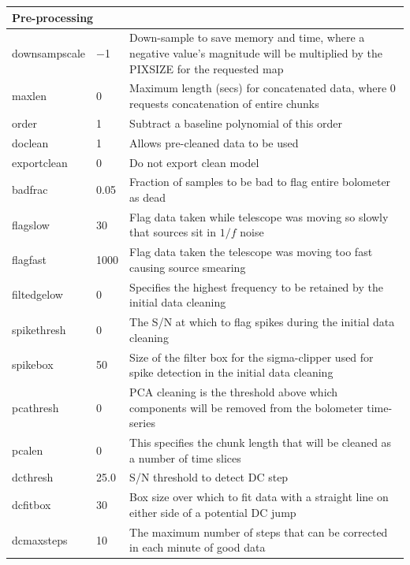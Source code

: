 \documentclass[twoside,11pt]{article}
\newenvironment{latexonly}{}{}
\renewcommand{\_}{\texttt{\symbol{95}}}
\begin{document}
\begin{latexonly}
\begin{table}[h]
\begin{center}
\begin{small}
\begin{tabular}{|p{2.5cm}|p{1.0cm}|p{11.2cm}|}
\hline
\multicolumn{3}{|l|}{\textbf{Pre-processing}}\\
\hline
downsampscale & $-$1 & Down-sample to save memory and time, where a negative
                       value's magnitude will be multiplied by the PIXSIZE
                       for the requested map \\
maxlen        &    0 & Maximum length (secs) for concatenated data, where
                       0 requests concatenation of entire chunks \\
order         &    1 & Subtract a baseline polynomial of this order \\
doclean       &    1 & Allows pre-cleaned data to be used \\
exportclean   &    0 & Do not export clean model \\
badfrac       & 0.05 & Fraction of samples to be bad to flag entire bolometer
                       as dead \\
flagslow      &   30 & Flag data taken while telescope was moving so slowly
                       that sources sit in $1/f$ noise \\
flagfast      & 1000 & Flag data taken the telescope was moving too fast
                       causing source smearing \\
filt\_edgelow &    0 & Specifies the highest frequency to be retained by the
                       initial data cleaning \\
spikethresh   &    0 & The S/N at which to flag spikes during the initial
                       data cleaning \\
spikebox      &   50 & Size of the filter box for the sigma-clipper used for
                       spike detection in the initial data cleaning \\
pcathresh     &    0 & PCA cleaning is the threshold above which components
                       will be removed from the bolometer time-series \\
pcalen        &    0 & This specifies the chunk length that will be cleaned
                       as a number of time slices \\
dcthresh      & 25.0 & S/N threshold to detect DC step \\
dcfitbox      &   30 & Box size over which to fit data with a straight
                       line on either side of a potential DC jump \\
dcmaxsteps    &   10 & The maximum number of steps that can be corrected
                       in each minute of good data \\

\end{tabular}
\end{small}
\end{center}
\end{table}
\end{latexonly}
\end{document}
